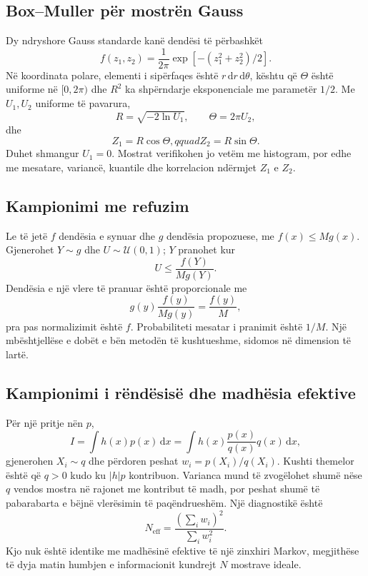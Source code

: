 \documentclass[11pt,oneside,openany]{book}
\newcommand{\dd}{\,\mathrm{d}}
\begin{document}
\subsection{Box--Muller për mostrën Gauss}
Dy ndryshore Gauss standarde kanë dendësi të përbashkët
\begin{equation}
 f(z_1,z_2)=\frac{1}{2\pi}\exp[-(z_1^2+z_2^2)/2].
\end{equation}
Në koordinata polare, elementi i sipërfaqes është $r\dd r\dd\theta$, kështu që $\Theta$ është uniforme në $[0,2\pi)$ dhe $R^2$ ka shpërndarje eksponenciale me parametër $1/2$. Me $U_1,U_2$ uniforme të pavarura,
\begin{equation}
 R=\sqrt{-2\ln U_1},\qquad \Theta=2\pi U_2,
\end{equation}
dhe
\begin{equation}
 Z_1=R\cos\Theta,qquad Z_2=R\sin\Theta.
\end{equation}
Duhet shmangur $U_1=0$. Mostrat verifikohen jo vetëm me histogram, por edhe me mesatare, variancë, kuantile dhe korrelacion ndërmjet $Z_1$ e $Z_2$.

\subsection{Kampionimi me refuzim}
Le të jetë $f$ dendësia e synuar dhe $g$ dendësia propozuese, me $f(x)\le Mg(x)$. Gjenerohet $Y\sim g$ dhe $U\sim\mathcal U(0,1)$; $Y$ pranohet kur
\begin{equation}
 U\le\frac{f(Y)}{Mg(Y)}.
\end{equation}
Dendësia e një vlere të pranuar është proporcionale me
\begin{equation}
 g(y)\frac{f(y)}{Mg(y)}=\frac{f(y)}{M},
\end{equation}
pra pas normalizimit është $f$. Probabiliteti mesatar i pranimit është $1/M$. Një mbështjellëse e dobët e bën metodën të kushtueshme, sidomos në dimension të lartë.

\subsection{Kampionimi i rëndësisë dhe madhësia efektive}
Për një pritje nën $p$,
\begin{equation}
 I=\int h(x)p(x)\dd x
 =\int h(x)\frac{p(x)}{q(x)}q(x)\dd x,
\end{equation}
gjenerohen $X_i\sim q$ dhe përdoren peshat $w_i=p(X_i)/q(X_i)$. Kushti themelor është që $q>0$ kudo ku $|h|p$ kontribuon. Varianca mund të zvogëlohet shumë nëse $q$ vendos mostra në rajonet me kontribut të madh, por peshat shumë të pabarabarta e bëjnë vlerësimin të paqëndrueshëm. Një diagnostikë është
\begin{equation}
 N_{\mathrm{eff}}=\frac{(\sum_iw_i)^2}{\sum_iw_i^2}.
\end{equation}
Kjo nuk është identike me madhësinë efektive të një zinxhiri Markov, megjithëse të dyja matin humbjen e informacionit kundrejt $N$ mostrave ideale.
\end{document}
